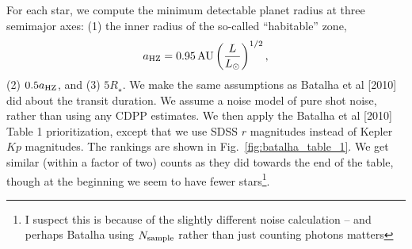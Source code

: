\documentclass{emulateapj}
\begin{document}
For each star, we compute the minimum detectable planet radius at three 
semimajor axes: (1) the inner radius of the so-called ``habitable'' zone,
\begin{equation}
a_{\rm HZ} = 0.95\, {\rm AU} \left(\frac{L}{L_\odot}\right)^{1/2},
\end{equation}
(2) $0.5 a_{\rm HZ}$, and (3) $5R_\star$. We make the same assumptions as 
Batalha et al [2010] did about the transit duration. We assume a noise model of 
pure shot noise, rather than using any CDPP estimates.
We then apply the Batalha et al [2010] Table 1 prioritization, except 
that we use SDSS $r$ magnitudes instead of Kepler $Kp$ magnitudes.
The rankings are shown in Fig.~\ref{fig:batalha_table_1}.
We get similar (within a factor of two) counts as they did towards the end of 
the table, though at the beginning we seem to have fewer stars\footnote{I 
suspect this is because of the slightly different noise calculation -- and 
perhaps Batalha using $N_{\rm sample}$ rather than just counting photons 
matters}.
\end{document}

